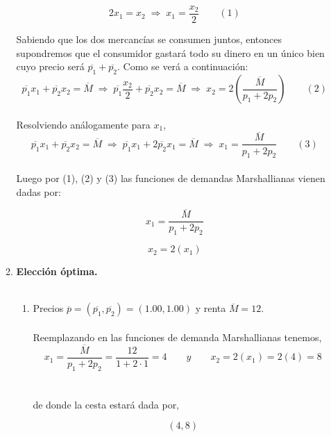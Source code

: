 \begin{enumerate}
\begin{enumerate}[\bfseries a)]
	    \begin{tcolorbox}[colframe=white]
		$$2x_1=x_2 \; \Longrightarrow \; x_1 = \dfrac{x_2}{2} \qquad (1)$$
	    \end{tcolorbox}
	    Sabiendo que los dos mercancías se consumen juntos, entonces supondremos que el consumidor gastará todo su dinero en un único bien cuyo precio será $\overline{p_1}+\overline{p_2}.$ Como se verá a continuación:\\
	    $$\overline{p_1}x_1 + \overline{p_2}x_2 =  \overline{M} \; \Longrightarrow \; \overline{p_1}\dfrac{x_2}{2} + \overline{p_2}x_2 =  \overline{M} \; \Longrightarrow \; x_2 = 2\left(\dfrac{\overline{M}}{p_1+2p_2}\right) \qquad (2)$$\\
	    Resolviendo análogamente para $x_1$,\\ 
	    $$\overline{p_1}x_1 + \overline{p_2}x_2 =  \overline{M} \; \Longrightarrow \; \overline{p_1}x_1 + 2\overline{p_2}x_1 = \overline{M} \; \Longrightarrow \; x_1 = \dfrac{\overline{M}}{p_1+2p_2}\qquad (3)$$\\
	    Luego por (1), (2) y (3) las funciones de demandas Marshallianas vienen dadas por:
	    \begin{tcolorbox}[colframe=white]
		$$x_1 = \dfrac{\overline{M}}{p_1+2p_2}$$
	    \end{tcolorbox}
	    \begin{tcolorbox}[colframe=white]
		$$x_2=2(x_1)$$
	    \end{tcolorbox}
	    \vspace{1cm}

	    \item \textbf{Elección óptima.} \\\\

		\begin{enumerate}[\bfseries b1)]

		    \item Precios $\overline{p} =  (\overline{p_1},\overline{p_2}) = (1.00,1.00)$ y renta $\overline{M} = 12$.\\\\

			Reemplazando en las funciones de demanda Marshallianas tenemos,\\
			$$x_1 = \dfrac{\overline{M}}{p_1+2p_2} = \dfrac{12}{1+2\cdot 1 } = 4 \qquad y \qquad x_2 = 2\left(x_1\right) = 2\left( 4 \right) = 8 $$\\\\
			de donde la cesta estará dada por,\\
			\begin{tcolorbox}[colframe=white]
			    $$(4,8)$$
			\end{tcolorbox}
			\vspace{1cm}



\end{enumerate}
\end{enumerate}
\end{enumerate}
